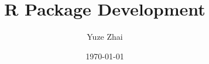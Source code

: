 \title{R Package Development}
\author{Yuze Zhai}
\date{\today}

\maketitle
\newpage
\tableofcontents
\newpage